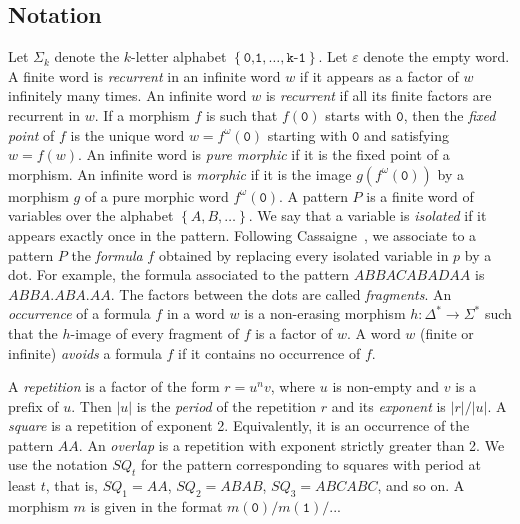\documentclass{article}
\def\acc#1{\left\{ #1 \right\}}
\theoremstyle{plain}
\theoremstyle{definition}
\theoremstyle{remark}
\begin{document}
\subsection{Notation}
Let $\Sigma_k$ denote the $k$-letter alphabet $\acc{\texttt{0,1},\dots,\texttt{k-1}}$.
Let $\varepsilon$ denote the empty word.
A finite word is \emph{recurrent} in an infinite word $w$ if it appears as a factor of $w$ infinitely many times.
An infinite word $w$ is \emph{recurrent} if all its finite factors are recurrent in $w$.
If a morphism $f$ is such that $f(\texttt{0})$ starts with $\texttt{0}$, then the \emph{fixed point} of $f$
is the unique word $w=f^\omega(\mathtt{0})$ starting with $\texttt{0}$ and satisfying $w=f(w)$. 
An infinite word is \emph{pure morphic} if it is the fixed point of a morphism.
An infinite word is \emph{morphic} if it is the image $g(f^\omega(\texttt{0}))$ by a morphism $g$ of a pure morphic word $f^\omega(\texttt{0})$.
A pattern $P$ is a finite word of variables over the alphabet $\acc{A,B,\dots}$.
We say that a variable is \emph{isolated} if it appears exactly once in the pattern.
Following Cassaigne~\cite{Cassaigne1994}, we associate to a pattern $P$ the \emph{formula} $f$
obtained by replacing every isolated variable in $p$ by a dot.
For example, the formula associated to the pattern $ABBACABADAA$ is $ABBA.ABA.AA$.
The factors between the dots are called \emph{fragments}.
An \emph{occurrence} of a formula $f$ in a word $w$ is a non-erasing morphism $h:\Delta^*\to\Sigma^*$
such that the $h$-image of every fragment of $f$ is a factor of $w$.
A word $w$ (finite or infinite) \emph{avoids} a formula $f$ if it contains no occurrence of $f$.

A \emph{repetition} is a factor of the form $r=u^nv$, where $u$ is non-empty and $v$ is a prefix of $u$.
Then $|u|$ is the \emph{period} of the repetition $r$ and its \emph{exponent} is $|r|/|u|$. 
A \emph{square} is a repetition of exponent 2. Equivalently, it is an occurrence of the pattern $AA$. 
An \emph{overlap} is a repetition with exponent strictly greater than 2.
We use the notation $SQ_t$ for the pattern corresponding to squares with period at least $t$,
that is, $SQ_1=AA$, $SQ_2=ABAB$, $SQ_3=ABCABC$, and so on.
A morphism $m$ is given in the format $m(\texttt{0})/m(\texttt{1})/...$
\end{document}
